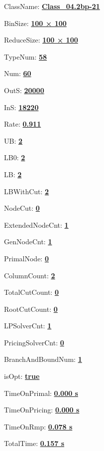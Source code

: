 \documentclass[11pt]{article}
\begin{document}
\pagestyle{empty}


ClassName: \underline{\textbf{Class_04.2bp-21}}
\par
BinSize: \underline{\textbf{100 × 100}}
\par
ReduceSize: \underline{\textbf{100 × 100}}
\par
TypeNum: \underline{\textbf{58}}
\par
Num: \underline{\textbf{60}}
\par
OutS: \underline{\textbf{20000}}
\par
InS: \underline{\textbf{18220}}
\par
Rate: \underline{\textbf{0.911}}
\par
UB: \underline{\textbf{2}}
\par
LB0: \underline{\textbf{2}}
\par
LB: \underline{\textbf{2}}
\par
LBWithCut: \underline{\textbf{2}}
\par
NodeCut: \underline{\textbf{0}}
\par
ExtendedNodeCnt: \underline{\textbf{1}}
\par
GenNodeCnt: \underline{\textbf{1}}
\par
PrimalNode: \underline{\textbf{0}}
\par
ColumnCount: \underline{\textbf{2}}
\par
TotalCutCount: \underline{\textbf{0}}
\par
RootCutCount: \underline{\textbf{0}}
\par
LPSolverCnt: \underline{\textbf{1}}
\par
PricingSolverCnt: \underline{\textbf{0}}
\par
BranchAndBoundNum: \underline{\textbf{1}}
\par
isOpt: \underline{\textbf{true}}
\par
TimeOnPrimal: \underline{\textbf{0.000 s}}
\par
TimeOnPricing: \underline{\textbf{0.000 s}}
\par
TimeOnRmp: \underline{\textbf{0.078 s}}
\par
TotalTime: \underline{\textbf{0.157 s}}
\par
\newpage
\end{document}
